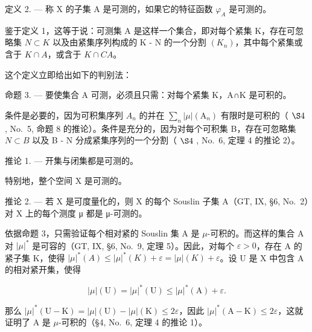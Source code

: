 定义 2. --- 称 X 的子集 A 是可测的，如果它的特征函数 \(\varphi_{A}\) 是可测的。

鉴于定义 1，这等于说：可测集 A 是这样一个集合，即对每个紧集 K，存在可忽略集 \(N \subset K\) 以及由紧集序列构成的 K - N 的一个分割 \((K_{n})\)，其中每个紧集或含于 \(K \cap A\)，或含于 \(K \cap C A\)。

这个定义立即给出如下的判别法：

命题 3. --- 要使集合 A 可测，必须且只需：对每个紧集 K，A∩K 是可积的。

条件是必要的，因为可积集序列 \(A_{n}\) 的并在 \(\sum_{n}|\mu|(\mathrm{A}_{n})\) 有限时是可积的（ \(\S4\) , No.~5, 命题 8 的推论）。条件是充分的，因为对每个可积集 B，存在可忽略集 \(N \subset B\) 以及 B - N 分成紧集序列的一个分割（ \(\S4\) , No.~6, 定理 4 的推论 2）。

推论 1. --- 开集与闭集都是可测的。

特别地，整个空间 \(\mathrm{X}\) 是可测的。

推论 2. --- 若 X 是可度量化的，则 X 的每个 Souslin 子集 A（GT, IX, §6, No.~2）对 X 上的每个测度 μ 都是 μ-可测的。

依据命题 3，只需验证每个相对紧的 Souslin 集 A 是 \(\mu\)-可积的。而这样的集合 A 对 \(|\mu|^*\) 是可容的（GT, IX, §6, No.~9, 定理 5）。因此，对每个 \(\varepsilon > 0\)，存在 A 的紧子集 K，使得 \(|\mu|^*(A) \leqslant |\mu|^*(K) + \varepsilon = |\mu|(K) + \varepsilon\)。设 U 是 X 中包含 A 的相对紧开集，使得

\[
| \mu | (\mathrm{U}) = | \mu | ^ {*} (\mathrm{U}) \leqslant | \mu | ^ {*} (\mathrm{A}) + \varepsilon .
\]

那么 \(|\mu|^*(\mathrm{U} - \mathrm{K}) = |\mu|(\mathrm{U}) - |\mu|(\mathrm{K}) \leqslant 2\varepsilon\)，因此 \(|\mu|^*(\mathrm{A} - \mathrm{K}) \leqslant 2\varepsilon\)，这就证明了 A 是 \(\mu\)-可积的（§4, No.~6, 定理 4 的推论 1）。

